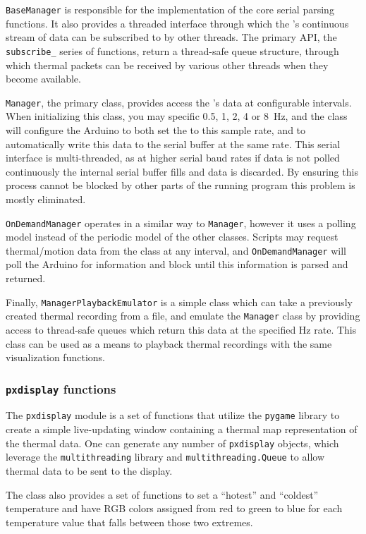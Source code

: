 \documentclass[../thesis/thesis.tex]{subfiles}
\begin{document}
\texttt{BaseManager} is responsible for the implementation of the core serial parsing functions. It also provides a threaded interface through which the \mlx's continuous stream of data can be subscribed to by other threads. The primary API, the \texttt{subscribe\_} series of functions, return a thread-safe queue structure, through which thermal packets can be received by various other threads when they become available.

\texttt{Manager}, the primary class, provides access the \mlx's data at configurable intervals. When initializing this class, you may specific 0.5, 1, 2, 4 or 8~Hz, and the class will configure the Arduino to both set the \mlx to this sample rate, and to automatically write this data to the serial buffer at the same rate. This serial interface is multi-threaded, as at higher serial baud rates if data is not polled continuously the internal serial buffer fills and data is discarded. By ensuring this process cannot be blocked by other parts of the running program this problem is mostly eliminated. 

\texttt{OnDemandManager} operates in a similar way to \texttt{Manager}, however it uses a polling model instead of the periodic model of the other classes. Scripts may request thermal/motion data from the class at any interval, and \texttt{OnDemandManager} will poll the Arduino for information and block until this information is parsed and returned.

Finally, \texttt{ManagerPlaybackEmulator} is a simple class which can take a previously created thermal recording from a file, and emulate the \texttt{Manager} class by providing access to thread-safe queues which return this data at the specified Hz rate. This class can be used as a means to playback thermal recordings with the same visualization functions.

\subsubsection*{\texttt{pxdisplay} functions}

The \texttt{pxdisplay} module is a set of functions that utilize the \texttt{pygame} library to create a simple live-updating window containing a thermal map representation of the thermal data. One can generate any number of \texttt{pxdisplay} objects, which leverage the \texttt{multithreading} library and \texttt{multithreading.Queue} to allow thermal data to be sent to the display.

The class also provides a set of functions to set a ``hotest'' and ``coldest'' temperature and have RGB colors assigned from red to green to blue for each temperature value that falls between those two extremes.
\end{document}
